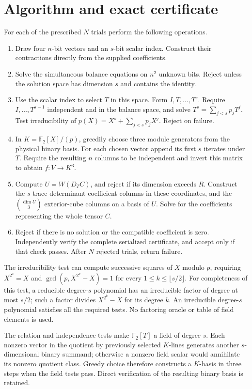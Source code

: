 \documentclass[11pt]{article}
\newcommand{\F}{\mathbb F}
\begin{document}
\section{Algorithm and exact certificate}\label{sec:algorithm}
For each of the prescribed $N$ trials perform the following operations.
\begin{enumerate}
\item Draw four $n$-bit vectors and an $s$-bit scalar index. Construct their
contractions directly from the supplied coefficients.
\item Solve the simultaneous balance equations on $n^2$ unknown bits.
Reject unless the solution space has dimension $s$ and contains the identity.
\item Use the scalar index to select $T$ in this space. Form
$I,T,\ldots,T^s$. Require $I,\ldots,T^{s-1}$ independent and in the balance
space, and solve $T^s=\sum_{j<s}p_jT^j$. Test irreducibility of
$p(X)=X^s+\sum_{j<s}p_jX^j$. Reject on failure.
\item In $K=\F_2[X]/(p)$, greedily choose three module generators from the
physical binary basis. For each chosen vector append its first $s$ iterates
under $T$. Require the resulting $n$ columns to be independent and invert
this matrix to obtain $f:V\to K^3$.
\item Compute $U=W(D_TC)$, and reject if its dimension exceeds $R$.
Construct the $s$ trace-determinant coefficient columns in these coordinates,
and the $\binom{\dim U}3$ exterior-cube columns on a basis of $U$.
Solve for the coefficients representing the whole tensor $C$.
\item Reject if there is no solution or the compatible coefficient is zero.
Independently verify the complete serialized certificate, and accept only if
that check passes. After $N$ rejected trials, return failure.
\end{enumerate}

The irreducibility test can compute successive squares of $X$ modulo $p$,
requiring $X^{2^s}=X$ and
$\gcd(p,X^{2^k}-X)=1$ for every $1\leq k\leq\lfloor s/2\rfloor$.
For completeness of this test, a reducible degree-$s$ polynomial has an
irreducible factor of degree at most $s/2$; such a factor divides
$X^{2^k}-X$ for its degree $k$. An irreducible degree-$s$ polynomial satisfies
all the required tests. No factoring oracle or table of field elements is used.

The relation and independence tests make $\F_2[T]$ a field of degree $s$.
Each nonzero vector in the quotient by previously selected $K$-lines generates
another $s$-dimensional binary summand; otherwise a nonzero field scalar would
annihilate its nonzero quotient class. Greedy choice therefore constructs a
$K$-basis in three steps when the field tests pass. Direct verification of
the resulting binary basis is retained.
\end{document}
